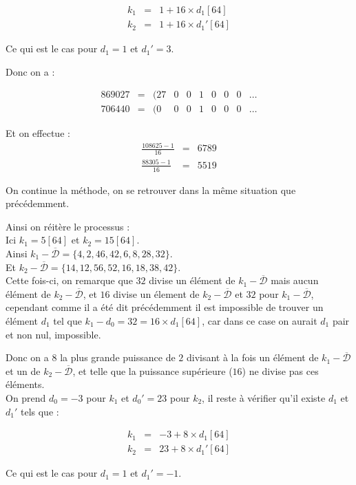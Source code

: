 \documentclass[12pt, a4paper]{memoir}
\newcommand{\dbarre}{\overline{\mathcal{D}}}
\begin{document}
   $$\begin{array}{ccc}
k_1 & = & 1 + 16 \times d_1[64] \\
k_2 & = & 1 + 16 \times d_1'[64]
 \end{array}$$
 
Ce qui est le cas pour $d_1 = 1$ et $d_1' = 3$. 

Donc on a :
 
 $$\begin{array}{cccccccccc}
  869027 & = & (27 & 0 & 0 & 1 & 0 & 0 & 0 & \ldots \\
  706440 & = & (0 & 0 & 0 & 1 & 0 & 0 & 0 & \ldots
 \end{array}$$
 
 Et on effectue :
 $$\begin{array}{cccccc}
  \frac{108625 - 1}{16} & = & 6789 \\
  \frac{88305-1}{16} & = & 5519
 \end{array}$$
 
 On continue la méthode, on se retrouver dans la même situation que précédemment.
 
 Ainsi on réitère le processus : \\
 Ici $k_1 = 5 [64]$ et $k_2 = 15 [64]$. \\
Ainsi  $k_1 - \dbarre = \{4,2,46,42,6,8,28,32\}$. \\
Et  $k_2 - \dbarre = \{14,12,56,52,16,18,38,42\}$. \\ 
 Cette fois-ci, on remarque que $32$ divise un élément de $k_1 - \dbarre$ mais aucun élément de $k_2 - \dbarre$,
et $16$ divise un élement de $k_2 - \dbarre$ et $32$ pour $k_1 - \dbarre$, cependant comme il a été dit précédemment
il est impossible de trouver un élément $d_1$ tel que $k_1 - d_0 = 32 = 16 \times d_1 [64]$, car dans ce case
on aurait $d_1$ pair et non nul, impossible.

Donc on a $8$ la plus grande puissance de $2$ divisant à la fois un élément de $k_1 - \dbarre$
et un de $k_2 - \dbarre$, et telle que la puissance supérieure ($16$) ne divise pas ces éléments. \\
On prend $d_0 = -3$ pour $k_1$ et $d_0' = 23$ pour $k_2$, il reste à vérifier qu'il existe $d_1$ et 
$d_1'$ tels que :

   $$\begin{array}{ccc}
k_1 & = & -3 + 8 \times d_1[64] \\
k_2 & = & 23 + 8 \times d_1'[64]
 \end{array}$$
 
Ce qui est le cas pour $d_1 = 1$ et $d_1' = -1$.
\end{document}
